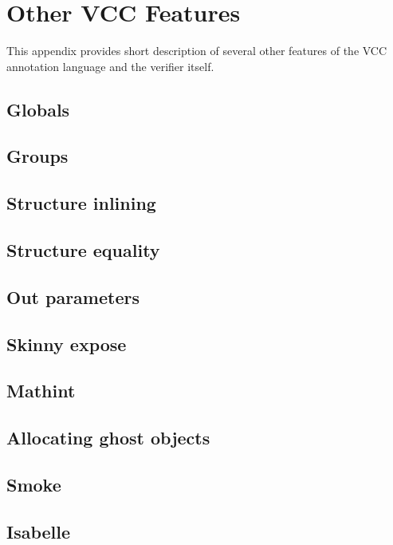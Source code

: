 \section{Other VCC Features}

This appendix provides short description of several other
features of the VCC annotation language and the verifier itself.

\subsection{Globals}
\subsection{Groups}
\subsection{Structure inlining}
\subsection{Structure equality}
\subsection{Out parameters}
\subsection{Skinny expose}
\subsection{Mathint}
\subsection{Allocating ghost objects}
\subsection{Smoke}
\subsection{Isabelle}
